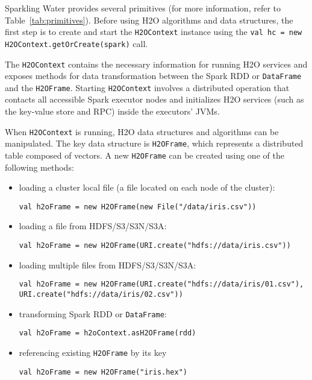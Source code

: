 \documentclass{standalone}
\begin{document}
Sparkling Water provides several primitives (for more information, refer to Table~\ref{tab:primitives}). Before using H2O algorithms and data structures, the first step is to create and start the \texttt{H2OContext} instance using the \texttt{val hc = new H2OContext.getOrCreate(spark)} call. 

The \texttt{H2OContext} contains the necessary information for running H2O services and exposes methods for data transformation between the Spark RDD or \texttt{DataFrame} and the \texttt{H2OFrame}. Starting \texttt{H2OContext} involves a distributed operation that contacts all accessible Spark executor nodes and initializes H2O services (such as the key-value store and RPC) inside the executors' JVMs.

When \texttt{H2OContext} is running, H2O data structures and algorithms can be manipulated. The key data structure is \texttt{H2OFrame}, which represents a distributed table composed of vectors. A new \texttt{H2OFrame} can be created using one of the following methods:
\begin{itemize}
	\item loading a cluster local file (a file located on each node of the cluster):
\begin{lstlisting}[style=Scala]
val h2oFrame = new H2OFrame(new File("/data/iris.csv"))
\end{lstlisting}
	\item loading a file from HDFS/S3/S3N/S3A:
\begin{lstlisting}[style=Scala]
val h2oFrame = new H2OFrame(URI.create("hdfs://data/iris.csv"))
\end{lstlisting}
	\item loading multiple files from HDFS/S3/S3N/S3A:
\begin{lstlisting}[style=Scala]
val h2oFrame = new H2OFrame(URI.create("hdfs://data/iris/01.csv"), URI.create("hdfs://data/iris/02.csv"))
\end{lstlisting}
	\item transforming Spark RDD or \texttt{DataFrame}:
\begin{lstlisting}[style=Scala]
val h2oFrame = h2oContext.asH2OFrame(rdd)
\end{lstlisting}
	\item referencing existing \texttt{H2OFrame} by its key
\begin{lstlisting}[style=Scala]
val h2oFrame = new H2OFrame("iris.hex")
\end{lstlisting}		
\end{itemize}
\end{document}
